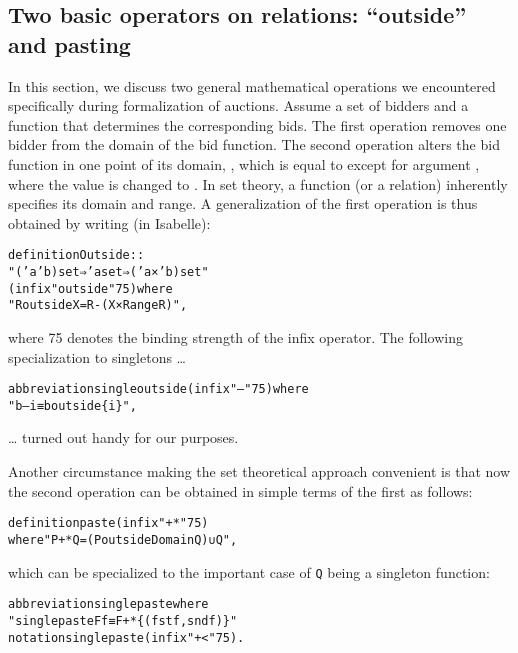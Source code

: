\documentclass[
]{llncs}
\newenvironment{mytable}{
\vspace{0.2ex}
\begin{center}\begin{minipage}
{0.9\textwidth}\renewcommand{\baselinestretch}{0.75}\begin{small}}
{\end{small}\end{minipage}\end{center}
\vspace{0.1ex}
}
\newcommand{\I}{Isabelle}
\begin{document}
\subsection{Two basic operators on relations: “outside” and pasting}
\label{RefOutside}
In this section, we discuss two general mathematical operations we encountered specifically during formalization of auctions. Assume a set of bidders 
 and a function  that determines the corresponding bids.
The first operation removes one bidder  from the domain  of the bid function.
The second operation alters the bid function in one point  of its domain, , which is equal to  except for argument , where the value is changed to .
In set theory, a function (or a relation) inherently specifies its domain and range.
A generalization of the first operation is thus obtained by writing (in \I):
\begin{mytable}
\begin{alltt}
definition Outside :: 
"('a   'b) set ⇒ 'a set ⇒ ('a × 'b) set" 
(infix "outside" 75) where 
"R outside X = R - (X × Range R)",
\end{alltt}
\end{mytable}
where 75 denotes the binding strength of the infix operator. The following specialization to singletons …
\begin{mytable}
\begin{alltt}
abbreviation singleoutside (infix "--" 75) where 
"b -- i ≡ b outside \{i\}",
\end{alltt}
\end{mytable}
… turned out handy for our purposes.

Another circumstance making the set theoretical approach convenient is that now the second operation can be obtained in simple terms of the first as follows:
\begin{mytable}
\begin{alltt}
definition paste (infix "+*" 75)
where "P +* Q = (P outside Domain Q) ∪ Q",
\end{alltt}
\end{mytable}
which can be specialized to the important case of \verb|Q| being a singleton function:
\begin{mytable}
\begin{alltt}
abbreviation singlepaste where 
"singlepaste F f ≡ F +* \{(fst f, snd f)\}"
notation singlepaste (infix "+<" 75).
\end{alltt}
\end{mytable}
\end{document}
